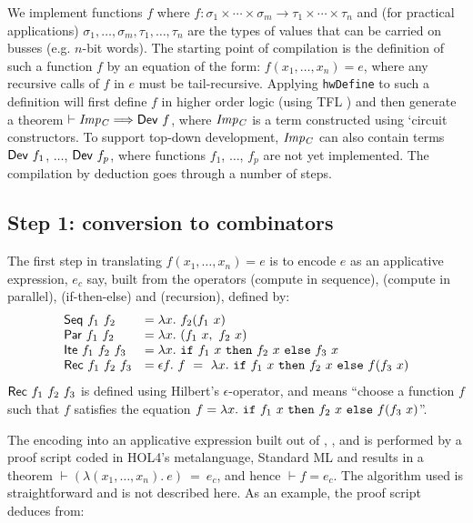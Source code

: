 We implement functions $f$ where
$
f : \sigma_1\times\cdots\times\sigma_m \rightarrow \tau_1\times\cdots\times\tau_n
$
and (for practical applications) $\sigma_1,\ldots,\sigma_m,\tau_1,\ldots,\tau_n$ are the types of
values that can be carried on busses (e.g. $n$-bit words).
The starting point of compilation is the definition of such a function $f$ by an equation of
the form: $f(x_1,\ldots,x_n)=e$, where any recursive calls of $f$ in
$e$ must be tail-recursive. Applying \texttt{hwDefine} to such a
definition will first define $f$ in higher order logic (using TFL
\cite{Slind?})  and then generate a theorem $\vdash {\it{Imp_C}}
\Longrightarrow \mathsf{Dev}~f$, where ${\it{Imp_C}}$ is a term
constructed using `circuit constructors.
To support top-down development, ${\it{Imp_C}}$ can also contain terms
$\mathsf{Dev}~f_1$, $\ldots$, $\mathsf{Dev}~f_p$, where functions $f_1$,
$\ldots$, $f_p$ are not yet implemented. The compilation by deduction
goes through a number of steps.

\subsection*{Step 1: conversion to combinators}

The first step in translating $f(x_1,\ldots,x_n)=e$ is to encode $e$
as an applicative expression, $e_c$ say, built from the operators 
(compute in sequence),
 (compute in parallel),  (if-then-else) and  (recursion), defined by:
\[
\begin{array}{ll}
\mathsf{Seq}~f_1~f_2     &   = \lambda x.~f_2(f_1~x)\\
\mathsf{Par}~f_1~f_2     &   = \lambda x.~(f_1~x,~f_2~x)\\
\mathsf{Ite}~f_1~f_2~f_3 &   = \lambda x.~ \texttt{if}~f_1~x~\texttt{then}~f_2~x~\texttt{else}~f_3~x\\
\mathsf{Rec}~f_1~f_2~f_3 &   = \epsilon f.~f~=~\lambda x.~\texttt{if}~f_1~x~\texttt{then}~f_2~x~\texttt{else}~f(f_3~x)
\end{array}
\]
$\mathsf{Rec}~f_1~f_2~f_3$ is defined using Hilbert's
$\epsilon$-operator, and means ``choose a function $f$ such that $f$
satisfies the equation $f =
\lambda x.~\texttt{if}~f_1~x~\texttt{then}~f_2~x~\texttt{else}~f(f_3~x)$''.  

The encoding into an applicative expression built out of ,
,  and  is performed by a proof script
coded in HOL4's metalanguage, Standard ML and results in a theorem $\vdash (\lambda(x_1,\ldots,x_n).~e)~=~e_c$,
and hence $\vdash f=e_c$.
The algorithm used is straightforward
and is not described here. As an example, the proof script deduces
from:


